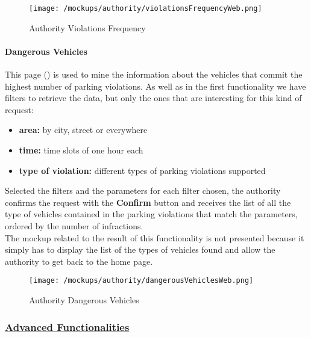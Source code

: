 				\begin{figure}[ht!]
					\centering
					\texttt{[image: /mockups/authority/violationsFrequencyWeb.png]}
					\caption{\label{fig:violationsFrequencyWeb} Authority Violations Frequency}
				\end{figure}
				
				\paragraph{Dangerous Vehicles}
				This page () is used to mine the information about the vehicles that commit the highest number of parking violations. As well as in the first functionality we have filters to retrieve the data, but only the ones that are interesting for this kind of request:
				
				\begin{itemize}
					\item \textbf{area:} by city, street or everywhere
					\item \textbf{time:} time slots of one hour each
					\item \textbf{type of violation:} different types of parking violations supported
				\end{itemize}
			
				Selected the filters and the parameters for each filter chosen, the authority confirms the request with the \textbf{Confirm} button and receives the list of all the type of vehicles contained in the parking violations that match the parameters, ordered by the number of infractions.\\
				
				The mockup related to the result of this functionality is not presented because it simply has to display the list of the types of vehicles found and allow the authority to get back to the home page.
				
				 \vspace{0.6cm}
				
				\begin{figure}[ht!]
					\centering
					\texttt{[image: /mockups/authority/dangerousVehiclesWeb.png]}
					\caption{\label{fig:dangerousVehiclesWeb} Authority Dangerous Vehicles}
				\end{figure}
			
			\subsubsection[Advanced Functionalities]{\hyperlink{toc}{Advanced Functionalities}}
				\label{sec:authorityAdvancedFunctioalites}
				

